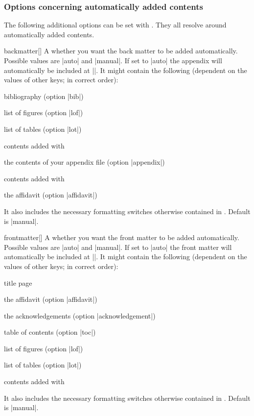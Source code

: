 \subsubsection{Options concerning automatically added contents}%
\label{sec:autoopt}
The following additional options can be set with . They all
resolve around automatically added contents.
\begin{describeopt}{backmatter}[]
  A  whether you want the back matter to be added automatically.
  Possible values are |auto| and |manual|. If set to |auto| the appendix will
  automatically be included at ||. It might contain the following
  (dependent on the values of other keys; in correct order):
  \begin{fakeitemize}
    \item bibliography (option |bib|)
    \item list of figures (option |lof|)
    \item list of tables (option |lot|)
    \item contents added with 
    \item the contents of your appendix file (option |appendix|)
    \item contents added with 
    \item the affidavit (option |affidavit|)
  \end{fakeitemize}
  It also includes the necessary formatting switches otherwise contained in
  . Default is |manual|.
\end{describeopt}
\begin{describeopt}{frontmatter}[]
  A  whether you want the front matter to be added automatically.
  Possible values are |auto| and |manual|. If set to |auto| the front matter
  will automatically be included at ||. It might contain the
  following (dependent on the values of other keys; in correct order):
  \begin{fakeitemize}
    \item title page
    \item the affidavit (option |affidavit|)
    \item the acknowledgements (option |acknowledgement|)
    \item table of contents (option |toc|)
    \item list of figures (option |lof|)
    \item list of tables (option |lot|)
    \item contents added with 
  \end{fakeitemize}
  It also includes the necessary formatting switches otherwise contained in
  . Default is |manual|.
\end{describeopt}

